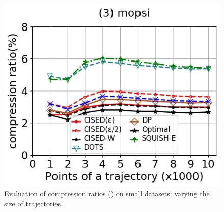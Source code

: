 \begin{figure}[tb!]
	\includegraphics[scale=0.250]{Figures/Exp-SED-CR-size-mopsi.jpg}		
	\vspace{-2ex}
	
	\caption{\small Evaluation of compression ratios (\sed) on small datasets: varying the size of
		trajectories.}
	\label{fig:cr-sed-size}
	\vspace{-2ex}
\end{figure}
